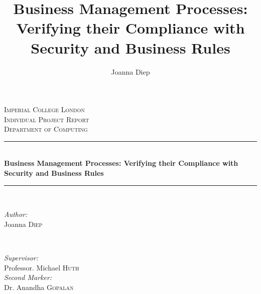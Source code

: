 \documentclass[a4paper]{report}
\title{Business Management Processes: Verifying their Compliance with Security and Business Rules}
\author{Joanna Diep}
\begin{document}
\large

\begin{titlepage}
\newcommand{\HRule}{\rule{\linewidth}{0.5mm}} %

\center %

\textsc{\LARGE Imperial College London}\\[1.5cm] %
\textsc{\Large Individual Project Report}\\[0.5cm] %
\textsc{\large Department of Computing}\\[0.5cm] %

\HRule \\[0.4cm]
{ \huge \bfseries Business Management Processes: Verifying their Compliance with Security and Business Rules}\\[0.4cm] %
\HRule \\[1.5cm]
 
\begin{minipage}{0.4\textwidth}
\begin{flushleft} \large
\emph{Author:}\\
Joanna \textsc{Diep} 
\end{flushleft}
\end{minipage}
~
\begin{minipage}{0.4\textwidth}
\begin{flushright} \large
\emph{Supervisor:} \\
Professor. Michael \textsc{Huth} \\ 
\emph{Second Marker:} \\
Dr. Anandha \textsc{Gopalan} 
\end{flushright}
\end{minipage}\\[4cm]


\end{titlepage}
\end{document}
